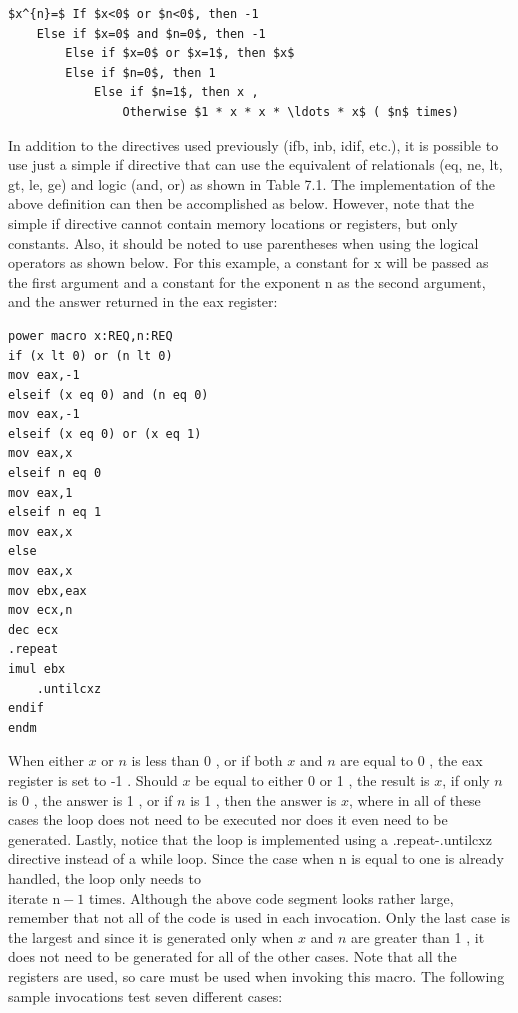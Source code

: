 \documentclass[10pt]{article}
\begin{document}
\begin{verbatim}
$x^{n}=$ If $x<0$ or $n<0$, then -1
    Else if $x=0$ and $n=0$, then -1
        Else if $x=0$ or $x=1$, then $x$
        Else if $n=0$, then 1
            Else if $n=1$, then x ,
                Otherwise $1 * x * x * \ldots * x$ ( $n$ times)
\end{verbatim}

In addition to the directives used previously (ifb, inb, idif, etc.), it is possible to use just a simple if directive that can use the equivalent of relationals (eq, ne, lt, gt, le, ge) and logic (and, or) as shown in Table 7.1. The implementation of the above definition can then be accomplished as below. However, note that the simple if directive cannot contain memory locations or registers, but only constants. Also, it should be noted to use parentheses when using the logical operators as shown below. For this example, a constant for x will be passed as the first argument and a constant for the exponent n as the second argument, and the answer returned in the eax register:

\begin{verbatim}
power macro x:REQ,n:REQ
if (x lt 0) or (n lt 0)
mov eax,-1
elseif (x eq 0) and (n eq 0)
mov eax,-1
elseif (x eq 0) or (x eq 1)
mov eax,x
elseif n eq 0
mov eax,1
elseif n eq 1
mov eax,x
else
mov eax,x
mov ebx,eax
mov ecx,n
dec ecx
.repeat
imul ebx
    .untilcxz
endif
endm
\end{verbatim}

When either $x$ or $n$ is less than 0 , or if both $x$ and $n$ are equal to 0 , the eax register is set to -1 . Should $x$ be equal to either 0 or 1 , the result is $x$, if only $n$ is 0 , the answer is 1 , or if $n$ is 1 , then the answer is $x$, where in all of these cases the loop does not need to be executed nor does it even need to be generated. Lastly, notice that the loop is implemented using a .repeat-.untilcxz directive instead of a while loop. Since the case when n is equal to one is already handled, the loop only needs to\\
iterate $\mathrm{n}-1$ times. Although the above code segment looks rather large, remember that not all of the code is used in each invocation. Only the last case is the largest and since it is generated only when $x$ and $n$ are greater than 1 , it does not need to be generated for all of the other cases. Note that all the registers are used, so care must be used when invoking this macro. The following sample invocations test seven different cases:
\end{document}
